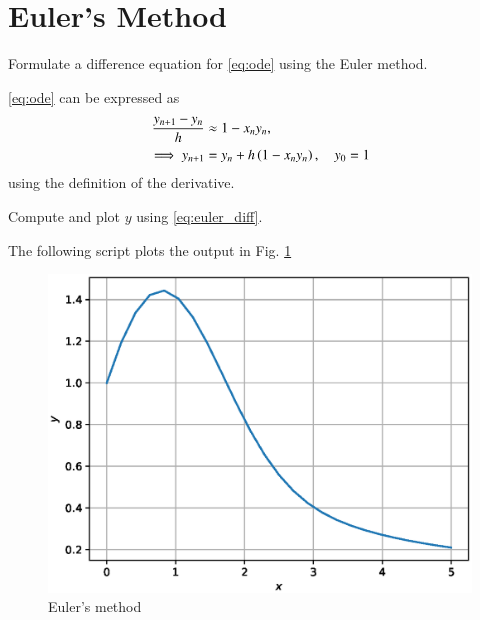 \documentclass[journal,12pt,twocolumn]{IEEEtran}
\begin{document}
\section{Euler's Method}
\begin{problem}
Formulate a difference equation for \eqref{eq:ode} using the Euler method.
\end{problem}
\solution \eqref{eq:ode} can be expressed as \cite{euler}
%
\begin{align}
\label{eq:euler_diff}
\frac{y_{n+1}-y_n}{h} &\approx 1 - x_ny_n, 
\\
\implies y_{n+1} &= y_n + h\left(1 - x_ny_n\right), \quad y_0 = 1
\end{align}
%
using the definition of the derivative.
\begin{problem}
Compute and plot $y$ using \eqref{eq:euler_diff}.
\end{problem}
\solution
 The following script plots the output in Fig. \ref{fig:euler}

\begin{figure}[!h]
\centering
\includegraphics[width=\columnwidth]{./figs/euler.eps}
\caption{Euler's method}
\label{fig:euler}
\end{figure}
\end{document}
